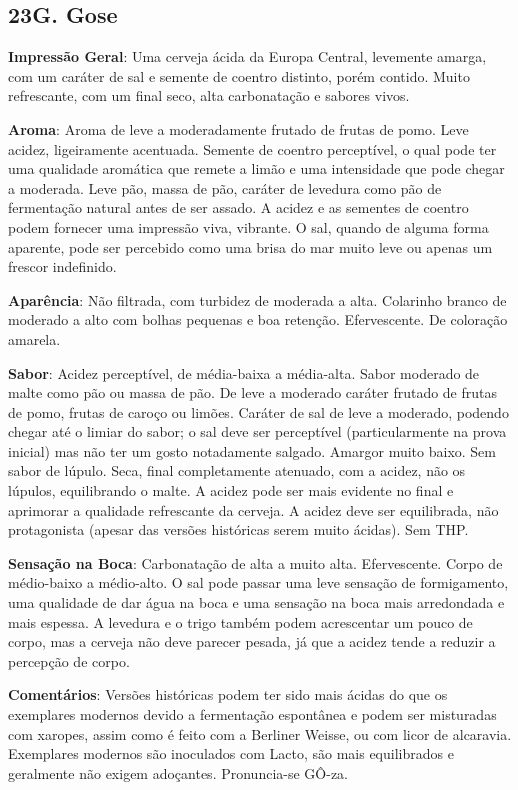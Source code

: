\subsection*{23G. Gose}
\textbf{Impressão Geral}: Uma cerveja ácida da Europa Central, levemente amarga, com um caráter de sal e semente de coentro distinto, porém contido. Muito refrescante, com um final seco, alta carbonatação e sabores vivos.

\textbf{Aroma}: Aroma de leve a moderadamente frutado de frutas de pomo. Leve acidez, ligeiramente acentuada. Semente de coentro perceptível, o qual pode ter uma qualidade aromática que remete a limão e uma intensidade que pode chegar a moderada. Leve pão, massa de pão, caráter de levedura como pão de fermentação natural antes de ser assado. A acidez e as sementes de coentro podem fornecer uma impressão viva, vibrante. O sal, quando de alguma forma aparente, pode ser percebido como uma brisa do mar muito leve ou apenas um frescor indefinido.

\textbf{Aparência}: Não filtrada, com turbidez de moderada a alta. Colarinho branco de moderado a alto com bolhas pequenas e boa retenção. Efervescente. De coloração amarela.

\textbf{Sabor}: Acidez perceptível, de média-baixa a média-alta. Sabor moderado de malte como pão ou massa de pão. De leve a moderado caráter frutado de frutas de pomo, frutas de caroço ou limões. Caráter de sal de leve a moderado, podendo chegar até o limiar do sabor; o sal deve ser perceptível (particularmente na prova inicial) mas não ter um gosto notadamente salgado. Amargor muito baixo. Sem sabor de lúpulo. Seca, final completamente atenuado, com a acidez, não  os lúpulos, equilibrando o malte. A acidez pode ser mais evidente no final e aprimorar a qualidade refrescante da cerveja. A acidez deve ser equilibrada, não protagonista (apesar das versões históricas serem muito ácidas). Sem THP.

\textbf{Sensação na Boca}: Carbonatação de alta a muito alta. Efervescente. Corpo de médio-baixo a médio-alto. O sal pode passar uma leve sensação de formigamento, uma qualidade de dar água na boca e uma sensação na boca mais arredondada e mais espessa. A levedura e o trigo também podem acrescentar um pouco de corpo, mas a cerveja não deve parecer pesada, já que a acidez tende a reduzir a percepção de corpo.

\textbf{Comentários}: Versões históricas podem ter sido mais ácidas do que os exemplares modernos devido a fermentação espontânea e podem ser misturadas com xaropes, assim como é feito com a Berliner Weisse, ou com licor de alcaravia. Exemplares modernos são inoculados com Lacto, são mais equilibrados e geralmente não exigem adoçantes. Pronuncia-se GÔ-za.

